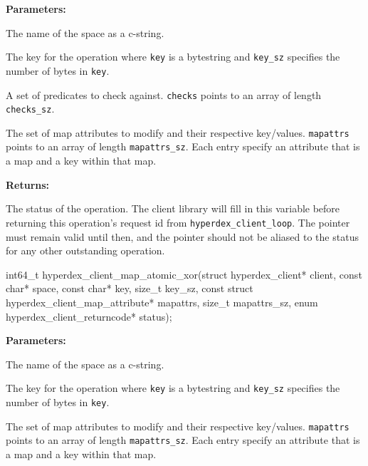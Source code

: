 \noindent\textbf{Parameters:}
\begin{description}[labelindent=\widthof{{\texttt{mapattrs}, \texttt{mapattrs\_sz}}},leftmargin=*,noitemsep,nolistsep,align=right]
\item[\texttt{space}] The name of the space as a c-string.
\item[\texttt{key}, \texttt{key\_sz}] The key for the operation where \texttt{key} is a bytestring and \texttt{key\_sz} specifies the number of bytes in \texttt{key}.
\item[\texttt{checks}, \texttt{checks\_sz}] A set of predicates to check against.  \texttt{checks} points to an array of length \texttt{checks\_sz}.
\item[\texttt{mapattrs}, \texttt{mapattrs\_sz}] The set of map attributes to modify and their respective key/values.  \texttt{mapattrs} points to an array of length \texttt{mapattrs\_sz}.  Each entry specify an attribute that is a map and a key within that map.
\end{description}

\noindent\textbf{Returns:}
\begin{description}[labelindent=\widthof{{\texttt{status}}},leftmargin=*,noitemsep,nolistsep,align=right]
\item[\texttt{status}] The status of the operation.  The client library will fill in this variable before returning this operation's request id from \texttt{hyperdex\_client\_loop}.  The pointer must remain valid until then, and the pointer should not be aliased to the status for any other outstanding operation.
\end{description}

\funcsep
{}
\begin{ccode}
int64_t hyperdex_client_map_atomic_xor(struct hyperdex_client* client,
                const char* space,
                const char* key, size_t key_sz,
                const struct hyperdex_client_map_attribute* mapattrs, size_t mapattrs_sz,
                enum hyperdex_client_returncode* status);
\end{ccode}
\funcdesc 

\noindent\textbf{Parameters:}
\begin{description}[labelindent=\widthof{{\texttt{mapattrs}, \texttt{mapattrs\_sz}}},leftmargin=*,noitemsep,nolistsep,align=right]
\item[\texttt{space}] The name of the space as a c-string.
\item[\texttt{key}, \texttt{key\_sz}] The key for the operation where \texttt{key} is a bytestring and \texttt{key\_sz} specifies the number of bytes in \texttt{key}.
\item[\texttt{mapattrs}, \texttt{mapattrs\_sz}] The set of map attributes to modify and their respective key/values.  \texttt{mapattrs} points to an array of length \texttt{mapattrs\_sz}.  Each entry specify an attribute that is a map and a key within that map.
\end{description}

